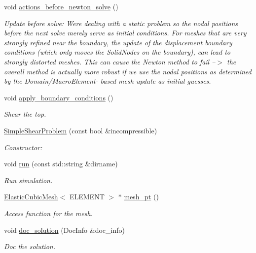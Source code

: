 \begin{DoxyCompactItemize}
void \hyperlink{classSimpleShearProblem_a2c63e1a6c120da147b0c4ec9764e1510}{actions\+\_\+before\+\_\+newton\+\_\+solve} ()
\begin{DoxyCompactList}\small\item\em Update before solve\+: We\textquotesingle{}re dealing with a static problem so the nodal positions before the next solve merely serve as initial conditions. For meshes that are very strongly refined near the boundary, the update of the displacement boundary conditions (which only moves the Solid\+Nodes {\itshape on} the boundary), can lead to strongly distorted meshes. This can cause the Newton method to fail --$>$ the overall method is actually more robust if we use the nodal positions as determined by the Domain/\+Macro\+Element-\/ based mesh update as initial guesses. \end{DoxyCompactList}\item 
void \hyperlink{classSimpleShearProblem_a1069985934b36d269b4bc8cb3ba00902}{apply\+\_\+boundary\+\_\+conditions} ()
\begin{DoxyCompactList}\small\item\em Shear the top. \end{DoxyCompactList}\item 
\hyperlink{classSimpleShearProblem_ada0881781b3332f88362528be39613d2}{Simple\+Shear\+Problem} (const bool \&incompressible)
\begin{DoxyCompactList}\small\item\em Constructor\+: \end{DoxyCompactList}\item 
void \hyperlink{classSimpleShearProblem_ac1746a2634e310571d40d70719d509c0}{run} (const std\+::string \&dirname)
\begin{DoxyCompactList}\small\item\em Run simulation. \end{DoxyCompactList}\item 
\hyperlink{classElasticCubicMesh}{Elastic\+Cubic\+Mesh}$<$ E\+L\+E\+M\+E\+NT $>$ $\ast$ \hyperlink{classSimpleShearProblem_af1a0759d0c04c749b0f08fb7f936c0c6}{mesh\+\_\+pt} ()
\begin{DoxyCompactList}\small\item\em Access function for the mesh. \end{DoxyCompactList}\item 
void \hyperlink{classSimpleShearProblem_a24c087d9ea194229930bcf9f889a048e}{doc\+\_\+solution} (Doc\+Info \&doc\+\_\+info)
\begin{DoxyCompactList}\small\item\em Doc the solution. \end{DoxyCompactList}\item 

\end{DoxyCompactItemize}
